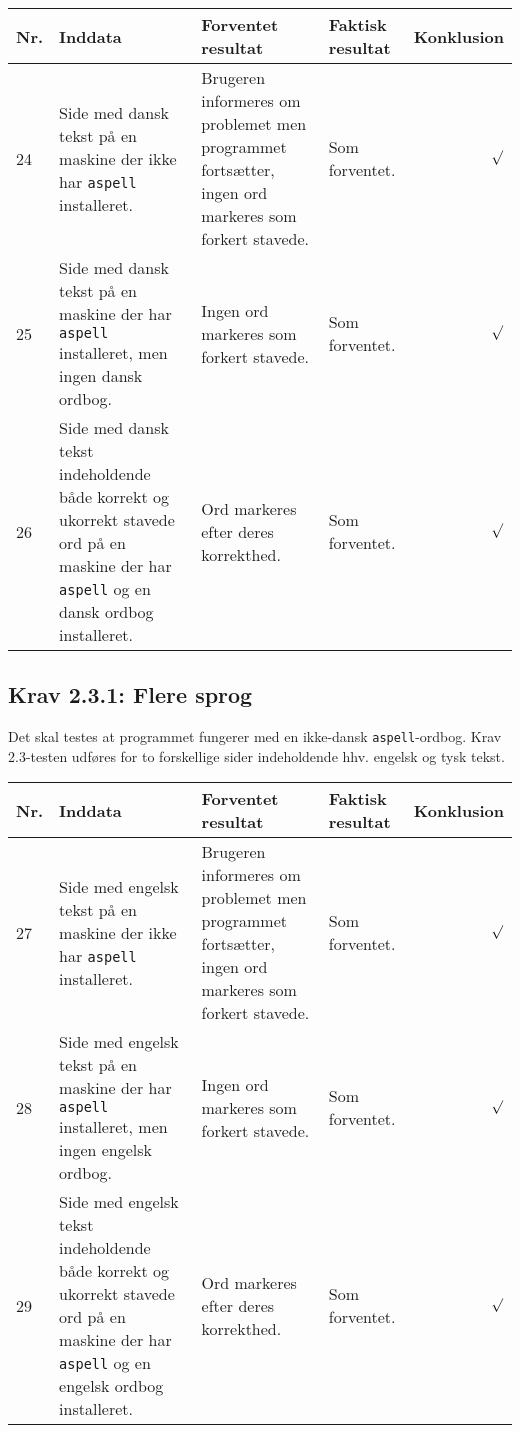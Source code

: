 \documentclass[a4paper,oneside,article]{memoir}
\begin{document}
\begin{landscape}
\begin{longtable}[c]{p{20pt}|p{220pt}|p{130pt}|p{130pt}|r}
\textbf{Nr.} &
\textbf{Inddata} &
\textbf{Forventet resultat} &
\textbf{Faktisk resultat} &
\textbf{Konklusion} \\ \hline

24 &
Side med dansk tekst på en maskine der ikke har \texttt{aspell}
installeret. &
Brugeren informeres om problemet men programmet fortsætter, ingen ord
markeres som forkert stavede. &
Som forventet. &
$\surd$ \\ \hline

25 &
Side med dansk tekst på en maskine der har \texttt{aspell}
installeret, men ingen dansk ordbog. &
Ingen ord markeres som forkert stavede. &
Som forventet. &
$\surd$ \\ \hline

26 &
Side med dansk tekst indeholdende både korrekt og ukorrekt stavede ord
på en maskine der har \texttt{aspell}
og en dansk ordbog installeret. &
Ord markeres efter deres korrekthed. &
Som forventet. &
$\surd$ \\ \hline

\end{longtable}

\subsection{Krav 2.3.1: Flere sprog}

Det skal testes at programmet fungerer med en ikke-dansk
\texttt{aspell}-ordbog. Krav 2.3-testen udføres for to forskellige
sider indeholdende hhv. engelsk og tysk tekst.

\begin{longtable}[c]{p{20pt}|p{220pt}|p{130pt}|p{130pt}|r}
\textbf{Nr.} &
\textbf{Inddata} &
\textbf{Forventet resultat} &
\textbf{Faktisk resultat} &
\textbf{Konklusion} \\ \hline

27 &
Side med engelsk tekst på en maskine der ikke har \texttt{aspell}
installeret. &
Brugeren informeres om problemet men programmet fortsætter, ingen ord
markeres som forkert stavede. &
Som forventet. &
$\surd$ \\ \hline

28 &
Side med engelsk tekst på en maskine der har \texttt{aspell}
installeret, men ingen engelsk ordbog. &
Ingen ord markeres som forkert stavede. &
Som forventet. &
$\surd$ \\ \hline

29 &
Side med engelsk tekst indeholdende både korrekt og ukorrekt stavede ord
på en maskine der har \texttt{aspell} og en engelsk ordbog
installeret. &
Ord markeres efter deres korrekthed. &
Som forventet. &
$\surd$ \\ \hline


\end{longtable}
\end{landscape}
\end{document}
